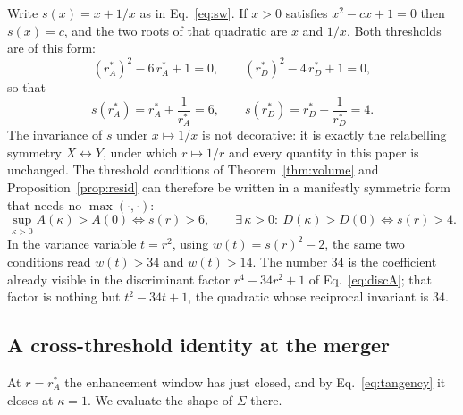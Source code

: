 \documentclass[11pt]{article}
\theoremstyle{plain}
\theoremstyle{remark}
\newcommand{\rA}{r_A^{*}}
\newcommand{\rD}{r_D^{*}}
\begin{document}
Write $s(x)=x+1/x$ as in Eq.~\eqref{eq:sw}. If $x>0$ satisfies $x^2-cx+1=0$ then $s(x)=c$, and
the two roots of that quadratic are $x$ and $1/x$. Both thresholds are of this form:
\begin{equation}
  (\rA)^2-6\,\rA+1=0,
  \qquad
  (\rD)^2-4\,\rD+1=0, \label{eq:bothquad}
\end{equation}
so that
\begin{equation}
  s(\rA)=\rA+\frac{1}{\rA}=6,
  \qquad
  s(\rD)=\rD+\frac{1}{\rD}=4 . \label{eq:s64}
\end{equation}
The invariance of $s$ under $x\mapsto1/x$ is not decorative: it is exactly the relabelling
symmetry $X\leftrightarrow Y$, under which $r\mapsto1/r$ and every quantity in this paper is
unchanged. The threshold conditions of Theorem~\ref{thm:volume} and
Proposition~\ref{prop:resid} can therefore be written in a manifestly symmetric form that needs
no $\max(\cdot,\cdot)$:
\begin{equation}
  \sup_{\kappa>0}A(\kappa)>A(0)\iff s(r)>6,
  \qquad
  \exists\,\kappa>0:\ D(\kappa)>D(0)\iff s(r)>4 . \label{eq:symmetricform}
\end{equation}
In the variance variable $t=r^2$, using $w(t)=s(r)^2-2$, the same two conditions read $w(t)>34$
and $w(t)>14$. The number $34$ is the coefficient already visible in the discriminant
factor $r^4-34r^2+1$ of Eq.~\eqref{eq:discA}; that factor is nothing but $t^2-34t+1$, the
quadratic whose reciprocal invariant is $34$.

\subsection{A cross-threshold identity at the merger}

At $r=\rA$ the enhancement window has just closed, and by Eq.~\eqref{eq:tangency} it closes at
$\kappa=1$. We evaluate the shape of $\Sigma$ there.
\end{document}
